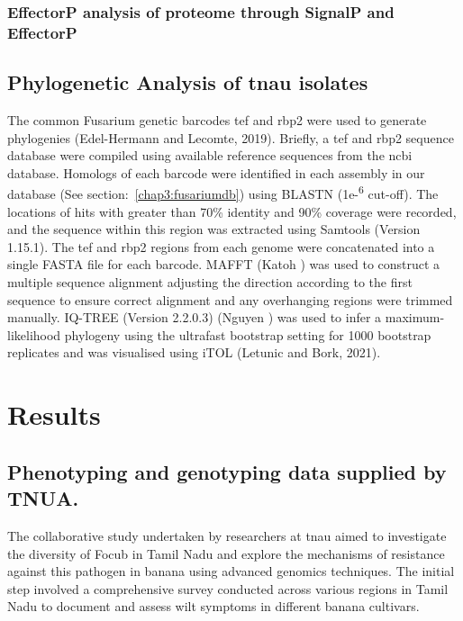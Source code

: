 \subsubsection{EffectorP analysis of proteome through SignalP and EffectorP}


\subsection{Phylogenetic Analysis of \ac{tnau} isolates}\label{chap2:phylogeny}

The common Fusarium genetic barcodes \ac{tef} and \ac{rbp2} were used to generate phylogenies (Edel-Hermann and Lecomte, 2019). Briefly, a \ac{tef} and \ac{rbp2} sequence database were compiled using available reference sequences from the \ac{ncbi} database. Homologs of each barcode were identified in each assembly in our database (See section:~\ref{chap3:fusariumdb}) using BLASTN (1e-\textsuperscript{6} cut-off). The locations of hits with greater than 70\% identity and 90\% coverage were recorded, and the sequence within this region was extracted using Samtools (Version 1.15.1). The \ac{tef} and \ac{rbp2} regions from each genome were concatenated into a single FASTA file for each barcode. MAFFT (Katoh ) was used to construct a multiple sequence alignment adjusting the direction according to the first sequence to ensure correct alignment and any overhanging regions were trimmed manually. IQ-TREE (Version 2.2.0.3) (Nguyen ) was used to infer a maximum-likelihood phylogeny using the ultrafast bootstrap setting for 1000 bootstrap replicates and was visualised using iTOL (Letunic and Bork, 2021). 




\section{Results}
\subsection{Phenotyping and genotyping data supplied by TNUA.}

The collaborative study undertaken by researchers at \acs{tnau} aimed to investigate the diversity of \ac{Focub} in Tamil Nadu and explore the mechanisms of resistance against this pathogen in banana using advanced genomics techniques. The initial step involved a comprehensive survey conducted across various regions in Tamil Nadu to document and assess wilt symptoms in different banana cultivars.

